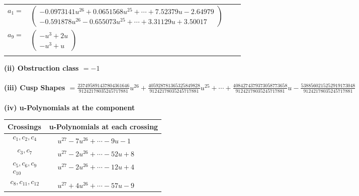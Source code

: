 \documentclass[1p]{elsarticle_modified}
\theoremstyle{definition}
\begin{document}
\begin{tabular}{m{7pt} m{180pt} m{7pt} m{180pt} }
\flushright $a_{1}=$&$\begin{pmatrix}-0.0973141 u^{26}+0.0651568 u^{25}+\cdots+7.52379 u-2.64979\\-0.591878 u^{26}-0.655073 u^{25}+\cdots+3.31129 u+3.50017\end{pmatrix}$ \\
\flushright $a_{9}=$&$\begin{pmatrix}- u^3+2 u\\- u^3+u\end{pmatrix}$\\&\end{tabular}
\flushleft \textbf{(ii) Obstruction class $= -1$}\\~\\
\flushleft \textbf{(iii) Cusp Shapes $= \frac{237495891437804361646}{91242178035245717881} u^{26}+\frac{405928781365325849828}{91242178035245717881} u^{25}+\cdots+\frac{4084274379373058773658}{91242178035245717881} u-\frac{5388560215252919173048}{91242178035245717881}$}\\~\\
\newpage\renewcommand{\arraystretch}{1}
\flushleft \textbf{(iv) u-Polynomials at the component}\newline \\
\begin{tabular}{m{50pt}|m{274pt}}
Crossings & \hspace{64pt}u-Polynomials at each crossing \\
\hline $$\begin{aligned}c_{1},c_{2},c_{4}\end{aligned}$$&$\begin{aligned}
&u^{27}-7 u^{26}+\cdots-9 u-1
\end{aligned}$\\
\hline $$\begin{aligned}c_{3},c_{7}\end{aligned}$$&$\begin{aligned}
&u^{27}-2 u^{26}+\cdots-52 u+8
\end{aligned}$\\
\hline $$\begin{aligned}c_{5},c_{6},c_{9}\\c_{10}\end{aligned}$$&$\begin{aligned}
&u^{27}-2 u^{26}+\cdots-12 u+4
\end{aligned}$\\
\hline $$\begin{aligned}c_{8},c_{11},c_{12}\end{aligned}$$&$\begin{aligned}
&u^{27}+4 u^{26}+\cdots-57 u-9
\end{aligned}$\\
\hline
\end{tabular}\\~\\
\end{document}
